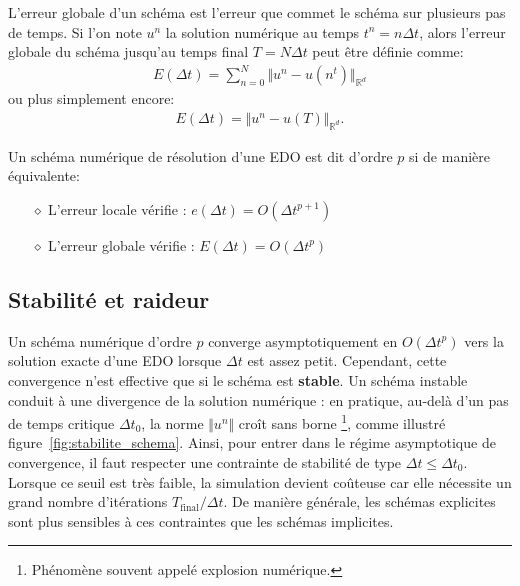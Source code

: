 \begin{definition}
    L'erreur globale d'un schéma est l'erreur que commet le schéma sur plusieurs pas de temps. 
    Si l'on note $u^n$ la solution numérique au temps $t^n = n \Delta t$, alors l'erreur globale du schéma jusqu'au temps final $T = N \Delta t$ peut être définie comme:
    \begin{align}
        E(\Delta t) = \sum_{n=0}^N \Vert u^n - u(n^t) \Vert_{\mathbb{R}^d}
    \end{align}
    ou plus simplement encore:
    \begin{align}
        E(\Delta t)=\Vert u^n - u(T) \Vert_{\mathbb{R}^d}.
    \end{align}
\end{definition}

\begin{definition}
    Un schéma numérique de résolution d'une EDO est dit d'ordre $p$ si de manière équivalente:
    \begin{itemize}
        \item[$\diamond$] L'erreur locale vérifie : $e(\Delta t) = O(\Delta t^{p+1})$
        \item[$\diamond$] L'erreur globale vérifie : $E(\Delta t) = O(\Delta t^{p})$
    \end{itemize}
\end{definition}



\subsection{Stabilité et raideur}\label{par:stabilite_edo}

Un schéma numérique d'ordre $p$ converge asymptotiquement en $O(\Delta t^p)$ vers la solution exacte d'une EDO lorsque $\Delta t$ est assez petit.
Cependant, cette convergence n'est effective que si le schéma est \textbf{stable}.  
Un schéma instable conduit à une divergence de la solution numérique : en pratique, au-delà d'un pas de temps critique $\Delta t_0$, la norme $\Vert u^n \Vert$ croît sans borne%
\footnote{Phénomène souvent appelé \og explosion numérique\fg.}, comme illustré figure~\ref{fig:stabilite_schema}.
Ainsi, pour entrer dans le régime asymptotique de convergence, il faut respecter une contrainte de stabilité de type $\Delta t \leq \Delta t_0$.  
Lorsque ce seuil est très faible, la simulation devient coûteuse car elle nécessite un grand nombre d’itérations $T_\mathrm{final}/\Delta t$.  
De manière générale, les schémas explicites sont plus sensibles à ces contraintes que les schémas implicites.

